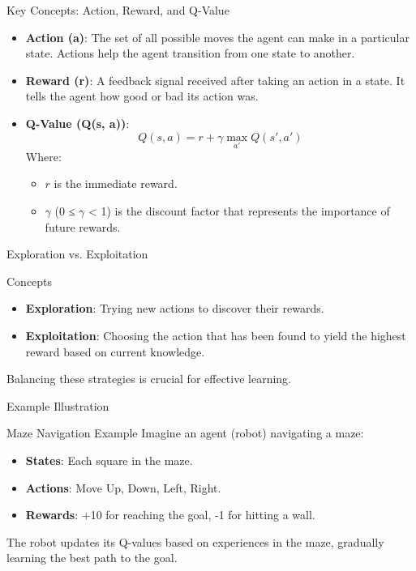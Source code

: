 \documentclass[aspectratio=169]{beamer}
\begin{document}
\begin{frame}[fragile]{Key Concepts: Action, Reward, and Q-Value}
  \begin{itemize}
    \item \textbf{Action (a)}: The set of all possible moves the agent can make in a particular state. Actions help the agent transition from one state to another.
    \item \textbf{Reward (r)}: A feedback signal received after taking an action in a state. It tells the agent how good or bad its action was.
    \item \textbf{Q-Value (Q(s, a))}: 
      \begin{equation}
        Q(s,a) = r + \gamma \max_{a'} Q(s', a')
      \end{equation}
      Where:
      \begin{itemize}
        \item \( r \) is the immediate reward.
        \item \( \gamma \) (0 ≤ $\gamma$ < 1) is the discount factor that represents the importance of future rewards.
      \end{itemize}
  \end{itemize}
\end{frame}

\begin{frame}[fragile]{Exploration vs. Exploitation}
  \begin{block}{Concepts}
    \begin{itemize}
      \item \textbf{Exploration}: Trying new actions to discover their rewards.
      \item \textbf{Exploitation}: Choosing the action that has been found to yield the highest reward based on current knowledge.
    \end{itemize}
    Balancing these strategies is crucial for effective learning.
  \end{block}
\end{frame}

\begin{frame}[fragile]{Example Illustration}
  \begin{block}{Maze Navigation Example}
    Imagine an agent (robot) navigating a maze:
    \begin{itemize}
      \item \textbf{States}: Each square in the maze.
      \item \textbf{Actions}: Move Up, Down, Left, Right.
      \item \textbf{Rewards}: +10 for reaching the goal, -1 for hitting a wall.
    \end{itemize}
    The robot updates its Q-values based on experiences in the maze, gradually learning the best path to the goal.
  \end{block}
\end{frame}
\end{document}
